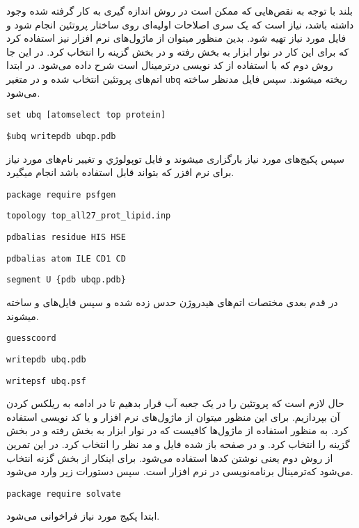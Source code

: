 
‌بلند
با توجه به نقص‌‌هایی که ممکن است در روش اندازه گیری به کار گرفته شده وجود داشته باشد، نیاز است که یک سری اصلاحات اولیه‌ای روی ساختار پروتئین انجام شود و فایل  مورد نیاز تهیه شود. بدین منظور میتوان از ماژول‌‌های نرم افزار  نیز استفاده کرد که برای این کار در نوار ابزار به بخش  رفته و در بخش  گزینه  را انتخاب کرد.
در این جا روش دوم که با استفاده از کد نویسی در‌ترمینال است شرح داده می‌شود.
در ابتدا اتم‌‌های پروتئین انتخاب شده و در متغیر \verb*|ubq| ریخته میشوند. سپس فایل  مدنظر ساخته می‌شود.
\begin{latin}
	\verb|set ubq [atomselect top protein]|
	
	\verb|$ubq writepdb ubqp.pdb|
\end{latin}
سپس پکیج‌‌های مورد نیاز بارگزاری میشوند و فایل توپولوژي و تغییر نام‌‌های مورد نیاز برای نرم افزر  که بتواند قابل استفاده باشد انجام میگیرد.
\begin{latin}
	\verb|package require psfgen|
	
	\verb|topology top_all27_prot_lipid.inp|
	
	\verb|pdbalias residue HIS HSE|
	
	\verb|pdbalias atom ILE CD1 CD|
	
	\verb|segment U {pdb ubqp.pdb}|
\end{latin}
در قدم بعدی مختصات اتم‌‌های هیدروژن حدس زده شده و سپس فایل‌‌های  و  ساخته میشوند.
\begin{latin}
	\verb|guesscoord|
	
	\verb|writepdb ubq.pdb|
	
	\verb|writepsf ubq.psf|
\end{latin}
حال لازم است که پروتئین را در یک جعبه آب قرار بدهیم تا در ادامه به ریلکس کردن آن بپردازیم. برای این منظور میتوان از ماژول‌‌های نرم افزار  و یا کد نویسی استفاده کرد. به منظور استفاده از ماژول‌ها کافیست که در نوار ابزار به بخش  رفته و در بخش  گزینه  را انتخاب کرد. و در صفحه باز شده فایل  و  مد نظر را انتخاب کرد.
در این تمرین از روش دوم یعنی نوشتن کد‌ها استفاده می‌شود. برای اینکار از بخش  گزنه  انتخاب می‌شود که‌ترمینال برنامه‌نویسی در نرم افزار  است. سپس دستورات زیر وارد می‌شود.
\begin{latin}
\verb|package require solvate|
\end{latin}
ابتدا پکیج مورد نیاز فراخوانی می‌شود.

